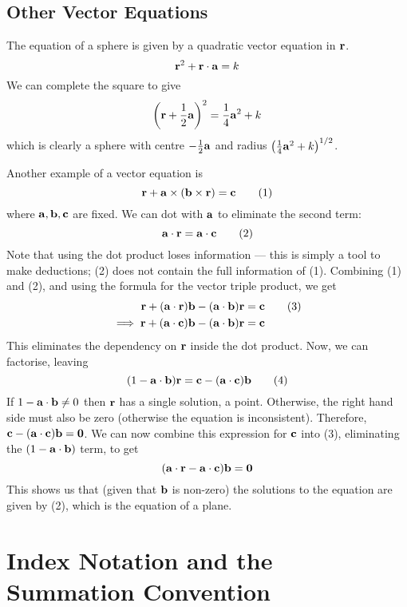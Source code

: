 \documentclass{article}
\begin{document}
\subsection{Other Vector Equations}
The equation of a sphere is given by a quadratic vector equation in $\vb r$.
\[ \vb r^2 + \vb r \cdot \vb a = k \]
We can complete the square to give
\[ \left(\vb r + \frac 1 2 \vb a \right)^2 = \frac 1 4 \vb a^2 + k \]
which is clearly a sphere with centre $-\frac 1 2 \vb a$ and radius $\left( \frac 1 4 \vb a^2 + k \right)^{1/2}$.

Another example of a vector equation is
\[ \vb r + \vb a \times (\vb b \times \vb r) = \vb c \tag{1} \]
where $\vb a, \vb b, \vb c$ are fixed. We can dot with $\vb a$ to eliminate the second term:
\[ \vb a \cdot \vb r = \vb a \cdot \vb c \tag{2} \]
Note that using the dot product loses information --- this is simply a tool to make deductions; (2) does not contain the full information of (1). Combining (1) and (2), and using the formula for the vector triple product, we get
\begin{align*}
    \vb r + (\vb a \cdot \vb r) \vb b - (\vb a \cdot \vb b) \vb r          & = \vb c \tag{3} \\
    \implies \vb r + (\vb a \cdot \vb c) \vb b - (\vb a \cdot \vb b) \vb r & = \vb c
\end{align*}
This eliminates the dependency on $\vb r$ inside the dot product. Now, we can factorise, leaving
\[ (1 - \vb a \cdot \vb b) \vb r = \vb c - (\vb a \cdot \vb c) \vb b \tag{4} \]
If $1 - \vb a \cdot \vb b \neq 0$ then $\vb r$ has a single solution, a point. Otherwise, the right hand side must also be zero (otherwise the equation is inconsistent). Therefore, $\vb c - (\vb a \cdot \vb c)\vb b = \vb 0$. We can now combine this expression for $\vb c$ into (3), eliminating the $(1- \vb a \cdot \vb b)$ term, to get
\[ (\vb a \cdot \vb r - \vb a \cdot \vb c) \vb b = \vb 0 \]
This shows us that (given that $\vb b$ is non-zero) the solutions to the equation are given by (2), which is the equation of a plane.

\section{Index Notation and the Summation Convention}
\end{document}
